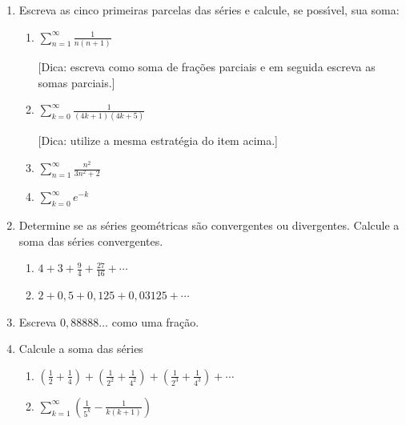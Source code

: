 \documentclass[a4paper,5pt]{amsbook}
\newcommand{\ds}{\displaystyle}
\begin{document}
\vspace{1cm}
\begin{enumerate}
    \setlength\itemsep{0.5cm}
    \item Escreva as cinco primeiras parcelas das s\'eries e calcule, se
    poss\'{\i}vel, sua soma:
    	\begin{enumerate}
            \setlength\itemsep{0.3cm}
    		\item $\ds\sum_{n=1}^\infty\ds\frac{1}{n(n+1)}$
    
                [Dica: escreva como soma de fra\c{c}\~oes parciais e em
                seguida escreva as somas parciais.]
    		\item $\ds\sum_{k=0}^\infty \ds\frac{1}{(4k+1)(4k+5)}$
    
                [Dica: utilize a mesma estrat\'egia do item acima.]
    		\item $\ds\sum_{n=1}^\infty\ds\frac{n^2}{3n^2+2}$
    		\item $\ds\sum_{k=0}^\infty e^{-k}$
    	\end{enumerate}
    
    \item Determine se as s\'eries geom\'etricas s\~ao convergentes ou divergentes.
    Calcule a soma das s\'eries convergentes.
    	\begin{enumerate}
            \setlength\itemsep{0.3cm}
    		\item $\ds4+3+\frac{9}{4}+\frac{27}{16}+\cdots$
    		\item $\ds2+0,5+0,125+0,03125+\cdots$
    	\end{enumerate}
    
    \item Escreva $0,88888\ldots$ como uma fra\c{c}\~ao.
    
    \item Calcule a soma das s\'eries
    	\begin{enumerate}
            \setlength\itemsep{0.3cm}
    		\item $\ds\left(\frac{1}{2}+\frac{1}{4}\right)+\left(\frac{1}{2^2}+\frac{1}{4^2}\right)+\left(\frac{1}{2^3}+\frac{1}{4^3}\right)+\cdots$
    		\item $\ds\sum_{k=1}^\infty \left(\frac{1}{5^k} - \frac{1}{k(k+1)}\right)$
    	\end{enumerate}
\end{enumerate}
\end{document}
